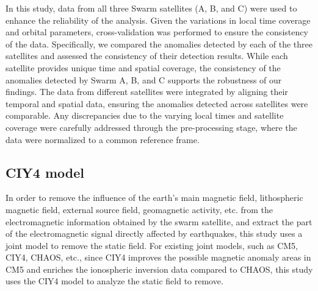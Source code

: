 \documentclass[3p,authoryear,preprint,12pt]{elsarticle}
\begin{document}
{In this study, data from all three Swarm satellites (A, B, and C) were used to enhance the reliability of the analysis. Given the variations in local time coverage and orbital parameters, cross-validation was performed to ensure the consistency of the data. Specifically, we compared the anomalies detected by each of the three satellites and assessed the consistency of their detection results. While each satellite provides unique time and spatial coverage, the consistency of the anomalies detected by Swarm A, B, and C supports the robustness of our findings. The data from different satellites were integrated by aligning their temporal and spatial data, ensuring the anomalies detected across satellites were comparable. Any discrepancies due to the varying local times and satellite coverage were carefully addressed through the pre-processing stage, where the data were normalized to a common reference frame.}
\subsection{CIY4 model}

{In order to remove the influence of the earth's main magnetic field, lithospheric magnetic field, external source field, geomagnetic activity, etc. from the electromagnetic information obtained by the swarm satellite, and extract the part of the electromagnetic signal directly affected by earthquakes, this study uses a joint model to remove the static field. For existing joint models, such as CM5, CIY4, CHAOS, etc., since CIY4 improves the possible magnetic anomaly areas in CM5 and enriches the ionospheric inversion data compared to CHAOS, this study uses the CIY4 model to analyze the static field to remove.}
\end{document}
